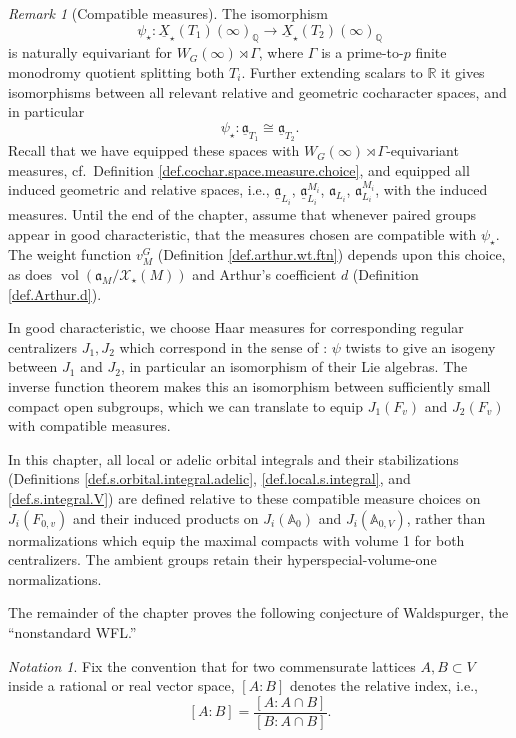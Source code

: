 \documentclass[openany]{amsbook}
\theoremstyle{definition}
\theoremstyle{remark}
\newtheorem{notation}[theorem]{Notation}
\newtheorem{remark}[theorem]{Remark}
\numberwithin{equation}{section}
\newcommand{\R}{\mathbb{R}}
\newcommand{\Q}{\mathbb{Q}}
\newcommand{\cX}{\mathcal{X}}
\newcommand{\A}{\mathbb{A}}
\newcommand{\ul}[1]{\underline{#1}}
\newcommand{\vol}{\operatorname{vol}}
\renewcommand{\-}{\operatorname{-}}
\renewcommand{\a}{\mathfrak{a}}
\renewcommand{\A}{\mathbb{A}}
\newcommand{\ga}{\ul{\a}}
\begin{document}
\begin{remark}[Compatible measures]\label{rmk.nonstd.measures}
   The isomorphism
$$
    \psi_\star : \ul{X}_\star(T_1)(\infty)_{\Q} \to \ul{X}_\star(T_2)(\infty)_{\Q}
$$
is naturally equivariant for $W_G(\infty) \rtimes \Gamma$, where $\Gamma$ is a prime-to-$p$ finite monodromy quotient splitting both $T_i$. Further extending scalars to $\R$ it gives isomorphisms between all relevant relative and geometric cocharacter spaces, and in particular
$$
    \psi_\star: \ga_{T_1} \cong \ga_{T_2}. 
$$
Recall that we have equipped these spaces with $W_G(\infty) \rtimes \Gamma$-equivariant measures, cf.\ Definition \ref{def.cochar.space.measure.choice}, and equipped all induced geometric and relative spaces, i.e., $\ga_{L_i}$, $\ga_{L_i}^{M_i}$, $\a_{L_i}$, $\a_{L_i}^{M_i}$, with the induced measures. Until the end of the chapter, assume that whenever paired groups appear in good characteristic, that the measures chosen are compatible with $\psi_\star$. The weight function $v_M^G$ (Definition \ref{def.arthur.wt.ftn}) depends upon this choice, as does $\vol(\a_M/\cX_\star(M))$ and Arthur's coefficient $d$ (Definition \ref{def.Arthur.d}). 
   
   In good characteristic, we choose Haar measures for corresponding regular centralizers $J_1, J_2$ which correspond in the sense of \cite[\S 1.12]{ngofl}: $\psi$ twists to give an isogeny between $J_1$ and $J_2$, in particular an isomorphism of their Lie algebras. The inverse function theorem makes this an isomorphism between sufficiently small compact open subgroups, which we can translate to equip $J_1(F_v)$ and $J_2(F_v)$ with compatible measures.

   In this chapter, all local or adelic orbital integrals and their stabilizations (Definitions \ref{def.s.orbital.integral.adelic}, \ref{def.local.s.integral}, and \ref{def.s.integral.V}) are defined relative to these compatible measure choices on $J_i(F_{0,v})$ and their induced products on $J_i(\A_0)$ and $J_i(\A_{0,V})$, rather than normalizations which equip the maximal compacts with volume 1 for both centralizers. The ambient groups retain their hyperspecial-volume-one normalizations.
\end{remark}

The remainder of the chapter proves the following conjecture of Waldspurger, the ``nonstandard WFL.''

\begin{notation}\label{not.commens.rel.index}
Fix the convention that for two commensurate lattices $A,B \subset V$ inside a rational or real vector space, $[A : B]$ denotes the relative index, i.e.,
$$
    [A : B] = \frac{[A : A \cap B]}{[B : A \cap B]}.
$$
\end{notation}
\end{document}
